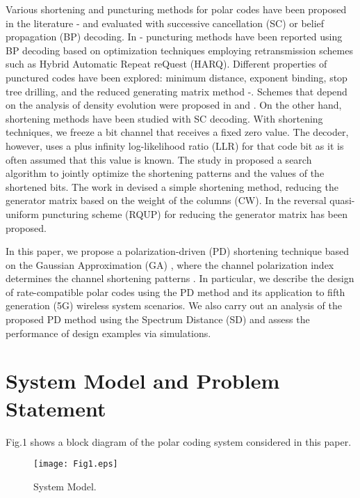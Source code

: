 \documentclass[10pt,twocolumn]{IEEEtran}
\begin{document}
Various shortening and puncturing methods for polar codes have been
proposed in the literature \cite{Niu}-\cite{Wang} and evaluated with
successive cancellation (SC) or belief propagation (BP) decoding. In
\cite{Hong}-\cite{NiuChen} puncturing methods have been reported
using BP decoding based on optimization techniques employing
retransmission schemes such as Hybrid Automatic Repeat reQuest
(HARQ). Different properties of punctured codes have been explored:
minimum distance, exponent binding, stop tree drilling, and the
reduced generating matrix method \cite{Chen}-\cite{Eslami}. Schemes
that depend on the analysis of density evolution were proposed in
\cite{EslamiPishro} and \cite{Kim}. On the other hand, shortening
methods have been studied with SC decoding. With shortening
techniques, we freeze a bit channel that receives a fixed zero
value. The decoder, however, uses a plus infinity log-likelihood
ratio (LLR) for that code bit as it is often assumed that this value
is known. The study in \cite{Miloslavskaya} proposed a search
algorithm to jointly optimize the shortening patterns and the values
of the shortened bits. The work in \cite{Wang} devised a simple
shortening method, reducing the generator matrix based on the weight
of the columns (CW). In \cite{Niu} the reversal quasi-uniform
puncturing scheme (RQUP) for reducing the generator matrix has been
proposed.

In this paper, we propose a polarization-driven (PD) shortening
technique based on the Gaussian Approximation (GA) \cite{Trifonov},
where the channel polarization index determines the channel
shortening patterns \cite{pd_short}. In particular, we describe the
design of rate-compatible polar codes using the PD method and its
application to fifth generation (5G) wireless system scenarios. We
also carry out an analysis of the proposed PD method using the
Spectrum Distance (SD) \cite{Niu} and assess the performance of
design examples via simulations.

\section{System Model and Problem Statement}

Fig.1 shows a block diagram of the polar coding system considered
in this paper.

\begin{figure}[htb]
\begin{center}
\texttt{[image: Fig1.eps]} %
\caption{System Model.}
\end{center}
\label{figura:fig23b}
\end{figure}
\end{document}
